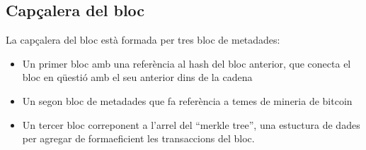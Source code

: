 \subsection{Capçalera del bloc}
La capçalera del bloc està formada per tres bloc de metadades: 
\begin{itemize}
    \item Un primer bloc amb una referència al hash del bloc anterior, que conecta el bloc en qüestió amb el seu anterior dins de la cadena
    \item  Un segon bloc de metadades que fa referència a temes de mineria de bitcoin
    \item Un tercer bloc correponent a l’arrel del “merkle tree”, una estuctura de dades per agregar de formaeficient les transaccions del bloc.
\end{itemize}

